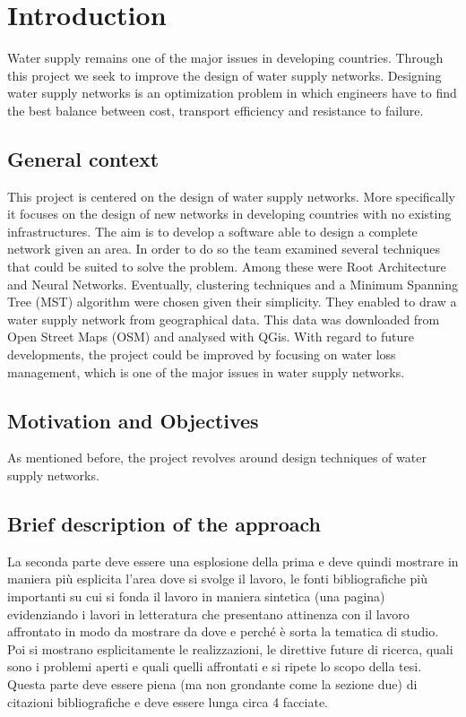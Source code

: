 \chapter{Introduction}
\label{Introduzione}
\thispagestyle{empty}



\noindent Water supply remains one of the major issues in developing countries. Through this
project we seek to improve the design of water supply networks. Designing water supply
networks is an optimization problem in which engineers have to find the best balance
between cost, transport efficiency and resistance to failure.

\section{General context}
This project is centered on the design of water supply networks. More specifically it focuses on the design of new 
networks in developing countries with no existing infrastructures.
The aim is to develop a software able to design a complete network given an area.
In order to do so the team examined several techniques that could be suited to solve the problem.
Among these were Root Architecture and Neural Networks. Eventually, clustering techniques and a Minimum
Spanning Tree (MST) algorithm were chosen given their simplicity. They enabled to draw a water supply network 
from geographical data. This data was downloaded from Open Street Maps (OSM) and analysed with QGis.
With regard to future developments, the project could be improved by focusing on water loss management,
which is one of the major issues in water supply networks.

\section{Motivation and Objectives}
As mentioned before, the project revolves around design techniques of water supply networks. 


\section{Brief description of the approach}
La seconda parte deve essere una esplosione della prima e deve quindi mostrare in maniera pi\`u esplicita l'area dove si svolge il lavoro, le fonti bibliografiche pi\`u importanti su cui si fonda il lavoro in maniera sintetica (una pagina) evidenziando i lavori in letteratura che presentano attinenza con il lavoro affrontato in modo da mostrare da dove e perch\'e \`e sorta la tematica di studio. Poi si mostrano esplicitamente le realizzazioni, le direttive future di ricerca, quali sono i problemi aperti e quali quelli affrontati e si ripete lo scopo della tesi. Questa parte deve essere piena (ma non grondante come la sezione due) di citazioni bibliografiche e deve essere lunga circa 4 facciate.



